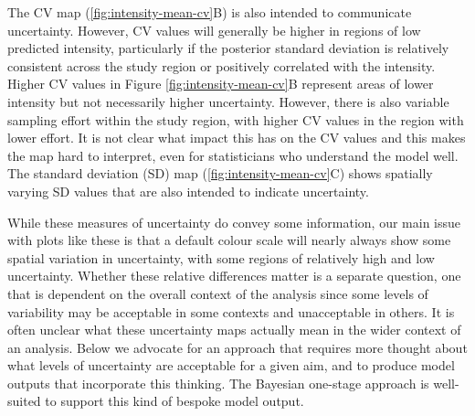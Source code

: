 \documentclass{statsoc}
\begin{document}
The CV map (\autoref{fig:intensity-mean-cv}B) is also intended to communicate uncertainty.  However, CV values will generally be higher in regions of low predicted intensity, particularly if the posterior standard deviation is relatively consistent across the study region or positively correlated with the intensity.  Higher CV values in Figure \ref{fig:intensity-mean-cv}B represent areas of lower intensity but not necessarily higher uncertainty.  However, there is also variable sampling effort within the study region, with higher CV values in the region with lower effort.  It is not clear what impact this has on the CV values and this makes the map hard to interpret, even for statisticians who understand the model well. The standard deviation (SD) map (\autoref{fig:intensity-mean-cv}C) shows spatially varying SD values that are also intended to indicate uncertainty.

While these measures of uncertainty do convey some information, our main issue with plots like these is that a default colour scale will nearly always show some spatial variation in uncertainty, with some regions of relatively high and low uncertainty.  Whether these relative differences matter is a separate question, one that is dependent on the overall context of the analysis since some levels of variability may be acceptable in some contexts and unacceptable in others.  It is often unclear what these uncertainty maps actually mean in the wider context of an analysis.  Below we advocate for an approach that requires more thought about what levels of uncertainty are acceptable for a given aim, and to produce model outputs that incorporate this thinking.  The Bayesian one-stage approach is well-suited to support this kind of bespoke model output.
\end{document}

